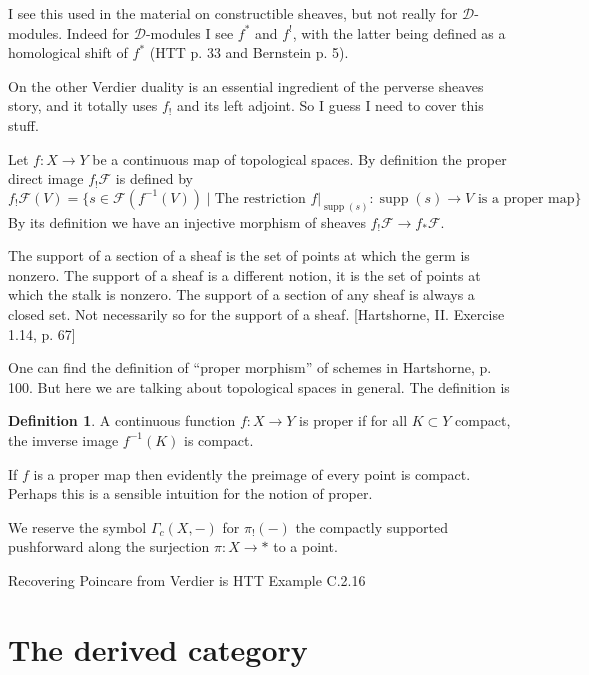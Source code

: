 \documentclass[12pt]{article}
\theoremstyle{plain}
\theoremstyle{definition}
\newtheorem{defn}{Definition}[section]
\numberwithin{equation}{section}
\DeclareMathOperator{\supp}{supp}
\newcommand{\CD}{\mathcal{D}}
\newcommand{\CF}{\mathcal{F}}
\begin{document}
{\color{blue} I see this used in the material on constructible sheaves, but not really for $\CD$-modules. Indeed for $\CD$-modules I see $f^*$ and $f^!$, with the latter being defined as a homological shift of $f^*$ (HTT p. 33 and Bernstein p. 5).

On the other Verdier duality is an essential ingredient of the perverse sheaves story, and it totally uses $f_!$ and its left adjoint. So I guess I need to cover this stuff.

}


Let $f : X \rightarrow Y$ be a continuous map of topological spaces. By definition the proper direct image $f_!\CF$ is defined by
\[
f_!\CF(V) = \{ s \in \CF(f^{-1}(V)) \mid \text{The restriction $f|_{\supp(s)} : \supp(s) \rightarrow V$ is a proper map} \}
\]
By its definition we have an injective morphism of sheaves $f_!\CF \rightarrow f_*\CF$.

The support of a section of a sheaf is the set of points at which the germ is nonzero. The support of a sheaf is a different notion, it is the set of points at which the stalk is nonzero. The support of a section of any sheaf is always a closed set. Not necessarily so for the support of a sheaf. [Hartshorne, II. Exercise 1.14, p. 67]

One can find the definition of ``proper morphism'' of schemes in Hartshorne, p. 100. But here we are talking about topological spaces in general. The definition is
\begin{defn}
A continuous function $f : X \rightarrow Y$ is proper if for all $K \subset Y$ compact, the imverse image $f^{-1}(K)$ is compact.
\end{defn}

If $f$ is a proper map then evidently the preimage of every point is compact. Perhaps this is a sensible intuition for the notion of proper.


We reserve the symbol $\Gamma_c(X, -)$ for $\pi_!(-)$ the compactly supported pushforward along the surjection $\pi : X \rightarrow *$ to a point.


{\color{red}Recovering Poincare from Verdier is HTT Example C.2.16}





\section{The derived category}
\end{document}
